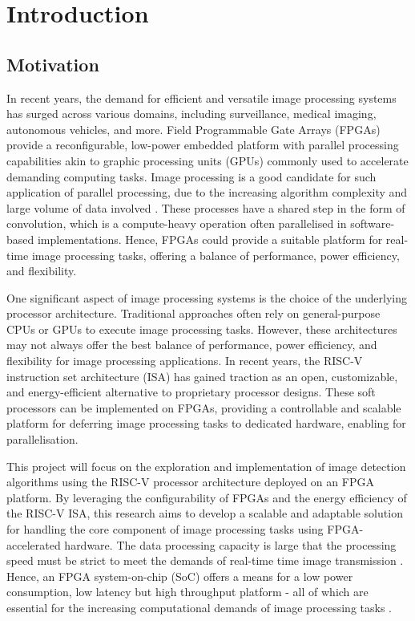 \chapter[Introduction]{Introduction}
\label{Chap:Intro}



\section{Motivation}

In recent years, the demand for efficient and versatile image processing systems has surged across various domains, including surveillance, medical imaging, autonomous vehicles, and more. 
Field Programmable Gate Arrays (FPGAs) provide a reconfigurable, low-power embedded platform with parallel processing capabilities akin to graphic processing units (GPUs) commonly used to accelerate demanding computing tasks. 
Image processing is a good candidate for such application of parallel processing, due to the increasing algorithm complexity and large volume of data involved \cite{Efficient}.
These processes have a shared step in the form of convolution, which is a compute-heavy operation often parallelised in software-based implementations.
Hence, FPGAs could provide a suitable platform for real-time image processing tasks, offering a balance of performance, power efficiency, and flexibility.

One significant aspect of image processing systems is the choice of the underlying processor architecture. 
Traditional approaches often rely on general-purpose CPUs or GPUs to execute image processing tasks. 
However, these architectures may not always offer the best balance of performance, power efficiency, and flexibility for image processing applications. 
In recent years, the RISC-V instruction set architecture (ISA) has gained traction as an open, customizable, and energy-efficient alternative to proprietary processor designs.
These soft processors can be implemented on FPGAs, providing a controllable and scalable platform for deferring image processing tasks to dedicated hardware, enabling for parallelisation.

This project will focus on the exploration and implementation of image detection algorithms using the RISC-V processor architecture deployed on an FPGA platform. 
By leveraging the configurability of FPGAs and the energy efficiency of the RISC-V ISA, this research aims to develop a scalable and adaptable solution for handling the core component of image processing tasks using FPGA-accelerated hardware.
The data processing capacity is large that the processing speed must be strict to meet the demands of real-time time image transmission \cite{Video}.
Hence, an FPGA system-on-chip (SoC) offers a means for a low power consumption, low latency but high throughput platform - all of which are essential for the increasing computational demands of image processing tasks \cite{Throughput}.

